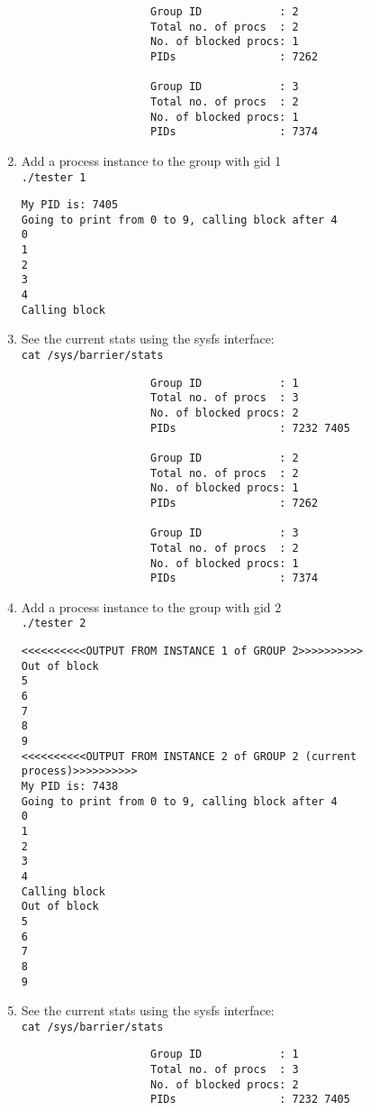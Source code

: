 \documentclass[10px]{article}
\begin{document}
\begin{enumerate}
\begin{verbatim}
                    Group ID            : 2
                    Total no. of procs  : 2
                    No. of blocked procs: 1
                    PIDs                : 7262 

                    Group ID            : 3
                    Total no. of procs  : 2
                    No. of blocked procs: 1
                    PIDs                : 7374 
\end{verbatim}
\item Add a process instance to the group with gid 1\\
\texttt{./tester 1}
\begin{verbatim}
My PID is: 7405
Going to print from 0 to 9, calling block after 4
0
1
2
3
4
Calling block
\end{verbatim}
\item See the current stats using the sysfs interface:\\
\texttt{cat /sys/barrier/stats}
\begin{verbatim}
                    Group ID            : 1
                    Total no. of procs  : 3
                    No. of blocked procs: 2
                    PIDs                : 7232 7405 

                    Group ID            : 2
                    Total no. of procs  : 2
                    No. of blocked procs: 1
                    PIDs                : 7262 

                    Group ID            : 3
                    Total no. of procs  : 2
                    No. of blocked procs: 1
                    PIDs                : 7374 
\end{verbatim}
\item Add a process instance to the group with gid 2\\
\texttt{./tester 2}
\begin{verbatim}
<<<<<<<<<<OUTPUT FROM INSTANCE 1 of GROUP 2>>>>>>>>>>
Out of block
5
6
7
8
9
<<<<<<<<<<OUTPUT FROM INSTANCE 2 of GROUP 2 (current process)>>>>>>>>>>
My PID is: 7438
Going to print from 0 to 9, calling block after 4
0
1
2
3
4
Calling block
Out of block
5
6
7
8
9
\end{verbatim}
\item See the current stats using the sysfs interface:\\
\texttt{cat /sys/barrier/stats}
\begin{verbatim}
                    Group ID            : 1
                    Total no. of procs  : 3
                    No. of blocked procs: 2
                    PIDs                : 7232 7405 


\end{verbatim}
\end{enumerate}
\end{document}
